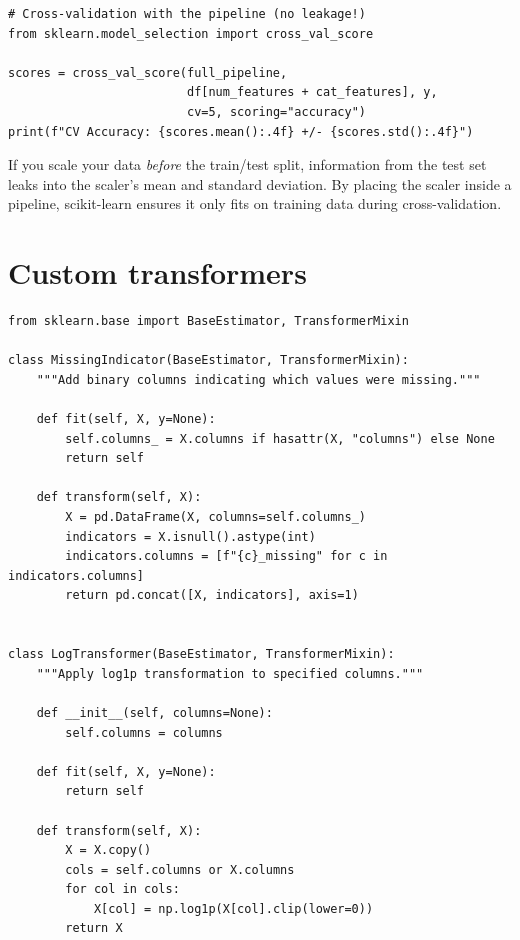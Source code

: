 \begin{verbatim}
# Cross-validation with the pipeline (no leakage!)
from sklearn.model_selection import cross_val_score

scores = cross_val_score(full_pipeline,
                         df[num_features + cat_features], y,
                         cv=5, scoring="accuracy")
print(f"CV Accuracy: {scores.mean():.4f} +/- {scores.std():.4f}")
\end{verbatim}

\begin{warningbox}
If you scale your data \emph{before} the train/test split, information from the test set leaks into the scaler's mean and standard deviation. By placing the scaler inside a pipeline, scikit-learn ensures it only fits on training data during cross-validation.
\end{warningbox}

\section{Custom transformers}

\begin{verbatim}
from sklearn.base import BaseEstimator, TransformerMixin

class MissingIndicator(BaseEstimator, TransformerMixin):
    """Add binary columns indicating which values were missing."""

    def fit(self, X, y=None):
        self.columns_ = X.columns if hasattr(X, "columns") else None
        return self

    def transform(self, X):
        X = pd.DataFrame(X, columns=self.columns_)
        indicators = X.isnull().astype(int)
        indicators.columns = [f"{c}_missing" for c in indicators.columns]
        return pd.concat([X, indicators], axis=1)


class LogTransformer(BaseEstimator, TransformerMixin):
    """Apply log1p transformation to specified columns."""

    def __init__(self, columns=None):
        self.columns = columns

    def fit(self, X, y=None):
        return self

    def transform(self, X):
        X = X.copy()
        cols = self.columns or X.columns
        for col in cols:
            X[col] = np.log1p(X[col].clip(lower=0))
        return X
\end{verbatim}

